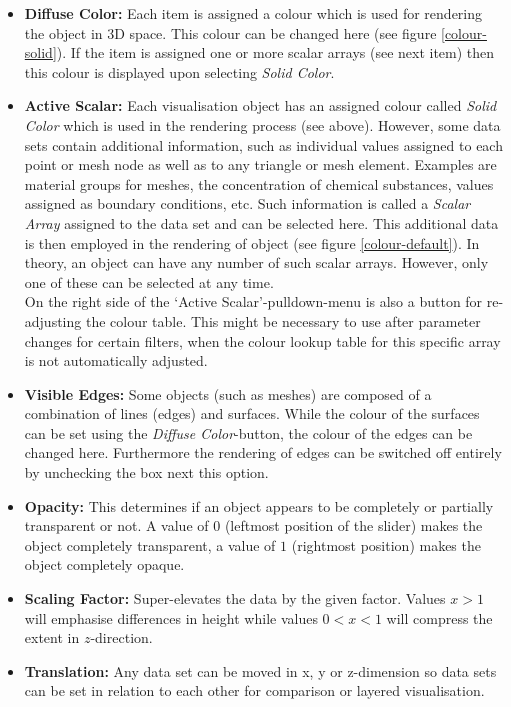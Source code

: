 \begin{itemize}
\item \textbf{Diffuse Color:} Each item is assigned a colour which is used for rendering the object in 3D space. This colour can be changed here (see figure \ref{colour-solid}). If the item is assigned one or more scalar arrays (see next item) then this colour is displayed upon selecting \emph{Solid Color}.
\item \textbf{Active Scalar:} Each visualisation object has an assigned colour called \emph{Solid Color} which is used in the rendering process (see above). However, some data sets contain additional information, such as individual values assigned to each point or mesh node as well as to any triangle or mesh element. Examples are material groups for meshes, the concentration of chemical substances, values assigned as boundary conditions, etc. Such information is called a \emph{Scalar Array} assigned to the data set and can be selected here. This additional data is then employed in the rendering of object (see figure \ref{colour-default}). In theory, an object can have any number of such scalar arrays. However, only one of these can be selected at any time.\\
    On the right side of the `Active Scalar'-pulldown-menu is also a button for re-adjusting the colour table. This might be necessary to use after parameter changes for certain filters, when the colour lookup table for this specific array is not automatically adjusted.
\item \textbf{Visible Edges:} Some objects (such as meshes) are composed of a combination of lines (edges) and surfaces. While the colour of the surfaces can be set using the \emph{Diffuse Color}-button, the colour of the edges can be changed here. Furthermore the rendering of edges can be switched off entirely by unchecking the box next this option.
\item \textbf{Opacity:} This determines if an object appears to be completely or partially transparent or not. A value of $0$ (leftmost position of the slider) makes the object completely transparent, a value of $1$ (rightmost position) makes the object completely opaque.
\item \textbf{Scaling Factor:} Super-elevates the data by the given factor. Values $x>1$ will emphasise differences in height while values $0<x<1$ will compress the extent in $z$-direction.
\item \textbf{Translation:} Any data set can be moved in x, y or z-dimension so data sets can be set in relation to each other for comparison or layered visualisation.
\end{itemize}


